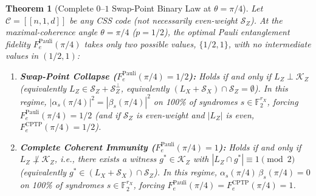\documentclass[11pt,a4paper]{article}
\theoremstyle{plain}
\newtheorem{theorem}{Theorem}[section]
\theoremstyle{definition}
\newcommand{\Ftwo}{\mathbb{F}_2}
\newcommand{\SZ}{\mathcal{S}_Z}
\newcommand{\SX}{\mathcal{S}_X}
\newcommand{\KZ}{\mathcal{K}_Z}
\begin{document}
\begin{theorem}[Complete $0$--$1$ Swap-Point Binary Law at $\theta = \pi/4$]
\label{thm:swap-binary}
Let $\mathcal{C} = [[n, 1, d]]$ be \emph{any} CSS code (not necessarily even-weight $\SZ$). At the maximal-coherence angle $\theta = \pi/4$ ($p = 1/2$), the optimal Pauli entanglement fidelity $F_e^{\mathrm{Pauli}}(\pi/4)$ takes \emph{only} two possible values, $\{1/2, 1\}$, with no intermediate values in $(1/2, 1)$:
\begin{enumerate}[label=(\alph*),leftmargin=1.8em,itemsep=2pt]
  \item \textbf{Swap-Point Collapse ($F_e^{\mathrm{Pauli}}(\pi/4) = 1/2$):} Holds if and only if $L_Z \perp \KZ$ (equivalently $L_Z \in \SZ + \SZ^\perp$, equivalently $(L_X + \SX) \cap \SZ = \emptyset$). In this regime, $|\alpha_s(\pi/4)|^2 = |\beta_s(\pi/4)|^2$ on 100\% of syndromes $s \in \Ftwo^{r_X}$, forcing $F_e^{\mathrm{Pauli}}(\pi/4) = 1/2$ (and if $\SZ$ is even-weight and $|L_Z|$ is even, $F_e^{\mathrm{CPTP}}(\pi/4) = 1/2$).
  \item \textbf{Complete Coherent Immunity ($F_e^{\mathrm{Pauli}}(\pi/4) = 1$):} Holds if and only if $L_Z \not\perp \KZ$, i.e., there exists a witness $g^* \in \KZ$ with $|L_Z \cap g^*| \equiv 1 \pmod 2$ (equivalently $g^* \in (L_X + \SX) \cap \SZ$). In this regime, $\alpha_s(\pi/4)\,\beta_s(\pi/4) = 0$ on 100\% of syndromes $s \in \Ftwo^{r_X}$, forcing $F_e^{\mathrm{Pauli}}(\pi/4) = F_e^{\mathrm{CPTP}}(\pi/4) = 1$.
\end{enumerate}
\end{theorem}
\end{document}
